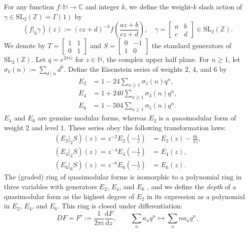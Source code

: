 \documentclass[10pt,reqno]{amsproc}
\newcommand{\dd}{\mathrm{d}}
\newcommand{\1}{\mathds{1}}	%
\theoremstyle{definition}
\theoremstyle{remark}
\begin{document}
For any function $f: \mathbb{H} \to \mathbb{C}$ and integer $k$, we define the weight-$k$ slash action of $\gamma \in \mathrm{SL}_2(\mathbb{Z}) = \Gamma(1)$ by
\[
    (f|_{k} \gamma)(z) := (cz + d)^{-k}f \left(\frac{az + b}{cz + d}\right), \quad \gamma = \begin{bmatrix} a & b \\ c & d \end{bmatrix} \in \mathrm{SL}_{2}(\mathbb{Z}).
\]
We denote by $T = \left[\begin{smallmatrix} 1 & 1 \\ 0 & 1\end{smallmatrix}\right]$ and $S = \left[\begin{smallmatrix} 0 & -1 \\ 1 & 0\end{smallmatrix}\right]$ the standard generators of $\mathrm{SL}_{2}(\mathbb{Z})$.
Let $q = e^{2\pi i z}$ for $z \in \mathbb{H}$, the complex upper half plane.
For $n \ge 1$, let $\sigma_k(n):= \sum_{d \mid n} d^k$.
Define the Eisenstein series of weights $2$, $4$, and $6$ by
\begin{align}
    E_2 &= 1 - 24 \sum_{n\geq 1}\sigma_1(n)q^n, \label{eqn:e2fourier} \\
    E_4 &= 1 + 240 \sum_{n \geq 1} \sigma_3(n)q^n, \label{eqn:e4fourier} \\
    E_6 &= 1 - 504 \sum_{n \geq 1} \sigma_5(n)q^n. \label{eqn:e6fourier}
\end{align}
$E_4$ and $E_6$ are genuine modular forms, whereas $E_2$ is a \emph{quasi}modular form of weight $2$ and level $1$.
These series obey the following transformation laws:
\begin{align*}
    (E_{2}|_{2}S)(z) = z^{-2}E_2\left(-\frac{1}{z} \right) &= E_2(z) - \frac{6 i}{\pi z},\\
    (E_{4}|_{4}S)(z) = z^{-4}E_4\left(-\frac{1}{z} \right) &= E_4(z), \\
    (E_{6}|_{6}S)(z) = z^{-6}E_6\left(-\frac{1}{z} \right) &= E_6(z).
\end{align*}
The (graded) ring of quasimodular forms is isomorphic to a polynomial ring in three variables with generators $E_2$, $E_4$, and $E_6$ \cite{bruinier2008elliptic}, and we define the \emph{depth} of a quasimodular form as the highest degree of $E_2$ in its expression as a polynomial in $E_2$, $E_4$, and $E_6$.
This ring is closed under differentiation:
\begin{equation}
    \label{eqn:D_def}
    DF = F' := \frac{1}{2\pi i} \frac{\dd F}{\dd z}, \qquad \sum_{n} a_n q^n \longmapsto \sum_{n} na_n q^n,
\end{equation}
\end{document}
